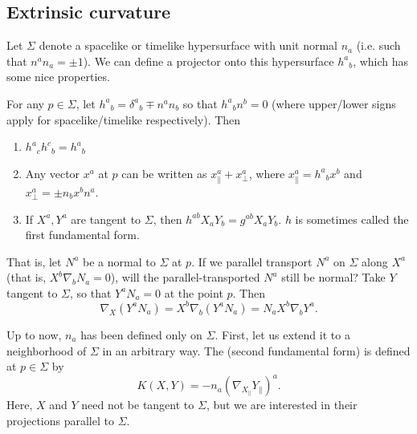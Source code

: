 \subsection*{Extrinsic curvature}
Let $\Sigma$ denote a spacelike or timelike hypersurface with unit normal $n_a$ (i.e. such that $n^a n_a=\pm 1$). We can define a projector onto this hypersurface $h^a{}_b$, which has some nice properties.
\begin{lem}
    For any $p\in \Sigma$, let $h^a{}_b = \delta^a{}_b \mp n^a n_b$ so that $h^a{}_b n^b =0$ (where upper/lower signs apply for spacelike/timelike respectively). Then
    \begin{enumerate}
        \item $h^a{}_c h^c{}_b=h^a{}_b$
        \item Any vector $x^a$ at $p$ can be written as $x^a_\parallel + x^a_\bot$, where $x^a_\parallel = h^a{}_b x^b$ and $x^a_\bot = \pm n_b x^b n^a$.
        \item If $X^a,Y^a$ are tangent to $\Sigma$, then $h^{ab} X_a Y_b=g^{ab} X_a Y_b$. $h$ is sometimes called the first fundamental form. 
    \end{enumerate}
\end{lem}
That is, let $N^a$ be a normal to $\Sigma$ at $p$. If we parallel transport $N^a$ on $\Sigma$ along $X^a$ (that is, $X^b \nabla_b N_a=0$), will the parallel-transported $N^a$ still be normal? Take $Y$ tangent to $\Sigma$, so that $Y^a N_a=0$ at the point $p$. Then
\begin{equation}
    \nabla_X (Y^a N_a)=X^b \nabla_b(Y^a N_a)=N_a X^b \nabla_b Y^a.
\end{equation}
\begin{defn}
    Up to now, $n_a$ has been defined only on $\Sigma$. First, let us extend it to a neighborhood of $\Sigma$ in an arbitrary way. The  (second fundamental form) is defined at $p\in \Sigma$ by
    \begin{equation}
        K(X,Y)=-n_a(\nabla_{X_\parallel} Y_{\parallel})^a.
    \end{equation}
    Here, $X$ and $Y$ need not be tangent to $\Sigma$, but we are interested in their projections parallel to $\Sigma$.
\end{defn}

